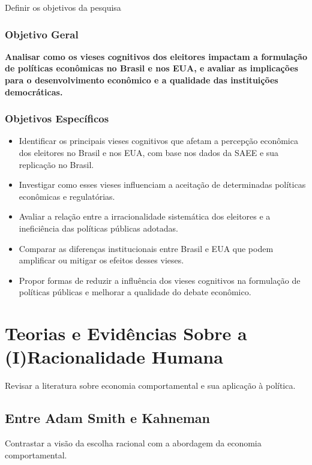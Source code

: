 Definir os objetivos da pesquisa

\subsection{Objetivo Geral} %

\textbf{Analisar como os vieses cognitivos dos eleitores impactam a formulação de políticas econômicas no Brasil e nos EUA, e avaliar as implicações para o desenvolvimento econômico e a qualidade das instituições democráticas.}

\subsection{Objetivos Específicos} %

\begin{itemize}
    \item Identificar os principais vieses cognitivos que afetam a percepção econômica dos eleitores no Brasil e nos EUA, com base nos dados da SAEE e sua replicação no Brasil.
    \item Investigar como esses vieses influenciam a aceitação de determinadas políticas econômicas e regulatórias.
    \item Avaliar a relação entre a irracionalidade sistemática dos eleitores e a ineficiência das políticas públicas adotadas.
    \item Comparar as diferenças institucionais entre Brasil e EUA que podem amplificar ou mitigar os efeitos desses vieses.
    \item Propor formas de reduzir a influência dos vieses cognitivos na formulação de políticas públicas e melhorar a qualidade do debate econômico.
\end{itemize}

\chapter{Teorias e Evidências Sobre a (I)Racionalidade Humana} %

Revisar a literatura sobre economia comportamental e sua aplicação à política.

\section{Entre Adam Smith e Kahneman} %

Contrastar a visão da escolha racional com a abordagem da economia comportamental.


